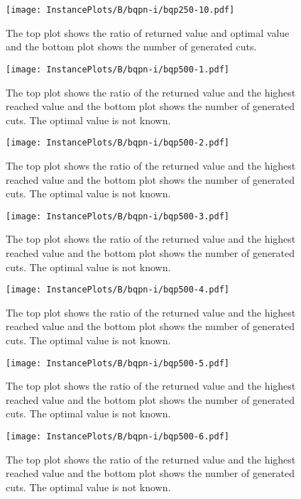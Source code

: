 \documentclass[10pt,a4paper]{article}
\begin{document}
\begin{figure}[H]
\texttt{[image: InstancePlots/B/bqpn-i/bqp250-10.pdf]}
\caption{The top plot shows the ratio of returned value and optimal value     and the bottom plot shows the number of generated cuts.}
\end{figure}

\begin{figure}[H]
\texttt{[image: InstancePlots/B/bqpn-i/bqp500-1.pdf]}
\caption{The top plot shows the ratio of the returned value and the highest reached value     and the bottom plot shows the number of generated cuts. The optimal value is not known.}
\end{figure}

\begin{figure}[H]
\texttt{[image: InstancePlots/B/bqpn-i/bqp500-2.pdf]}
\caption{The top plot shows the ratio of the returned value and the highest reached value     and the bottom plot shows the number of generated cuts. The optimal value is not known.}
\end{figure}

\begin{figure}[H]
\texttt{[image: InstancePlots/B/bqpn-i/bqp500-3.pdf]}
\caption{The top plot shows the ratio of the returned value and the highest reached value     and the bottom plot shows the number of generated cuts. The optimal value is not known.}
\end{figure}

\begin{figure}[H]
\texttt{[image: InstancePlots/B/bqpn-i/bqp500-4.pdf]}
\caption{The top plot shows the ratio of the returned value and the highest reached value     and the bottom plot shows the number of generated cuts. The optimal value is not known.}
\end{figure}

\begin{figure}[H]
\texttt{[image: InstancePlots/B/bqpn-i/bqp500-5.pdf]}
\caption{The top plot shows the ratio of the returned value and the highest reached value     and the bottom plot shows the number of generated cuts. The optimal value is not known.}
\end{figure}

\begin{figure}[H]
\texttt{[image: InstancePlots/B/bqpn-i/bqp500-6.pdf]}
\caption{The top plot shows the ratio of the returned value and the highest reached value     and the bottom plot shows the number of generated cuts. The optimal value is not known.}
\end{figure}
\end{document}
